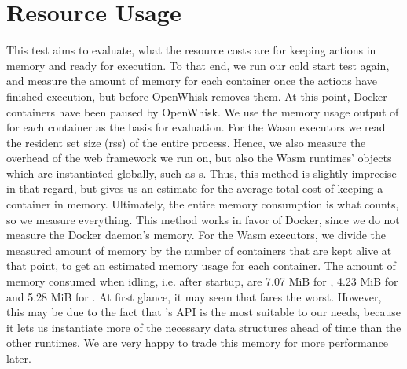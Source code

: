 
\section{Resource Usage}

This test aims to evaluate, what the resource costs are for keeping actions in memory and ready for execution.
To that end, we run our cold start test again, and measure the amount of memory for each container once the actions have finished execution, but before OpenWhisk removes them. At this point, Docker containers have been paused by OpenWhisk. We use the memory usage output of  for each container as the basis for evaluation. For the Wasm executors we read the resident set size (rss) of the entire process. Hence, we also measure the overhead of the web framework we run on, but also the Wasm runtimes' objects which are instantiated globally, such as s. Thus, this method is slightly imprecise in that regard, but gives us an estimate for the average total cost of keeping a container in memory. Ultimately, the entire memory consumption is what counts, so we measure everything. This method works in favor of Docker, since we do not measure the Docker daemon's memory.
For the Wasm executors, we divide the measured amount of memory by the number of containers that are kept alive at that point, to get an estimated memory usage for each container. The amount of memory consumed when idling, i.e. after startup, are 7.07 MiB for , 4.23 MiB for  and 5.28 MiB for . At first glance, it may seem that  fares the worst. However, this may be due to the fact that 's API is the most suitable to our needs, because it lets us instantiate more of the necessary data structures ahead of time than the other runtimes. We are very happy to trade this memory for more performance later.


